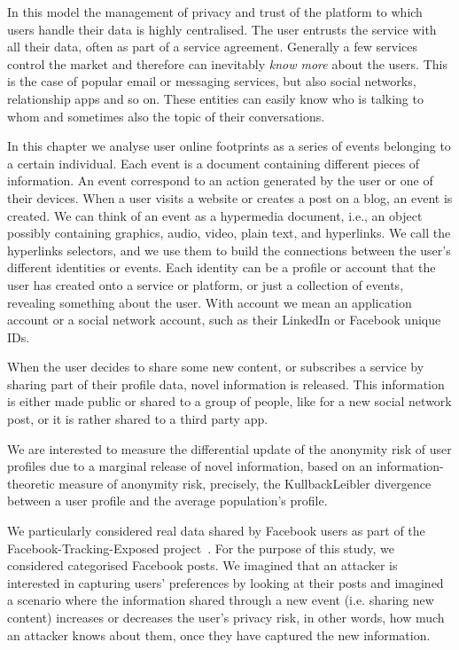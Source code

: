 In this model the management of privacy and trust of the platform to which users handle their data is highly centralised. The user entrusts the service with all their data, often as part of a service agreement. Generally a few services control the market and therefore can inevitably \emph{know more} about the users. This is the case of popular email or messaging services, but also social networks, relationship apps and so on. These entities can easily know who is talking to whom and sometimes also the topic of their conversations.

In this chapter we analyse user online footprints as a series of events belonging to a certain individual. Each event is a document containing different pieces of information. An event correspond to an action generated by the user or one of their devices. When a user visits a website or creates a post on a blog, an event is created. We can think of an event as a hypermedia document, i.e., an object possibly containing graphics, audio, video, plain text, and hyperlinks. We call the hyperlinks selectors, and we use them to build the connections between the user's different identities or events. Each identity can be a profile or account that the user has created onto a service or platform, or just a collection of events, revealing something about the user. With account we mean an application account or a social network account, such as their LinkedIn or Facebook unique IDs. 

When the user decides to share some new content, or subscribes a service by sharing part of their profile data, novel information is released. This information is either made public or shared to a group of people, like for a new social network post, or it is rather shared to a third party app.

We are interested to measure the differential update of the anonymity risk of user profiles due to a marginal release of novel information, based on an information-theoretic measure of anonymity risk, precisely, the Kullback\hyph Leibler divergence between a user profile and the average population's profile.

We particularly considered real data shared by Facebook users as part of the Facebook-Tracking-Exposed project~\cite{FTE}. For the purpose of this study, we considered categorised Facebook posts. We imagined that an attacker is interested in capturing users' preferences by looking at their posts and imagined a scenario where the information shared through a new event (i.e.  sharing new content) increases or decreases the user's privacy risk, in other words, how much an attacker knows about them, once they have captured the new information.


